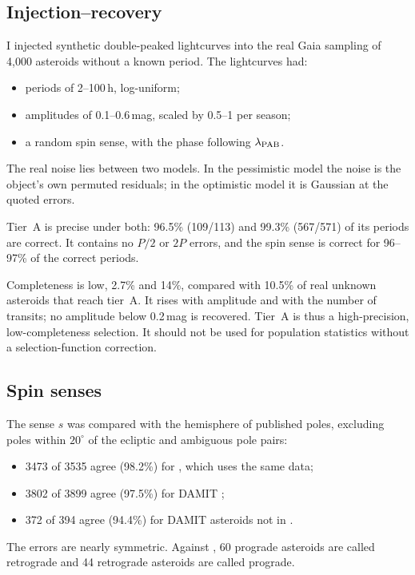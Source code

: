 \documentclass[twocolumn]{aastex631}
\begin{document}
\subsection{Injection--recovery}

I injected synthetic double-peaked lightcurves into the real Gaia sampling of 4{,}000 asteroids without a
known period. The lightcurves had:
\begin{itemize}
\item periods of 2--100\,h, log-uniform;
\item amplitudes of 0.1--0.6\,mag, scaled by 0.5--1 per season;
\item a random spin sense, with the phase following $\lambda_{\rm PAB}$.
\end{itemize}

The real noise lies between two models. In the pessimistic model the noise is the object's own permuted
residuals; in the optimistic model it is Gaussian at the quoted errors.

Tier~A is precise under both: 96.5\% (109/113) and 99.3\% (567/571) of its periods are correct. It contains
no $P/2$ or $2P$ errors, and the spin sense is correct for 96--97\% of the correct periods.

Completeness is low, 2.7\% and 14\%, compared with 10.5\% of real unknown asteroids that reach tier~A. It
rises with amplitude and with the number of transits; no amplitude below 0.2\,mag is recovered. Tier~A is
thus a high-precision, low-completeness selection. It should not be used for population statistics
without a selection-function correction.

\subsection{Spin senses}

The sense $s$ was compared with the hemisphere of published poles, excluding poles within $20^\circ$ of the
ecliptic and ambiguous pole pairs:
\begin{itemize}
\item 3473 of 3535 agree (98.2\%) for \citet{Durech2023}, which uses the same data;
\item 3802 of 3899 agree (97.5\%) for DAMIT \citep{Durech2010};
\item 372 of 394 agree (94.4\%) for DAMIT asteroids not in \citet{Durech2023}.
\end{itemize}

The errors are nearly symmetric. Against \citet{Durech2023}, 60 prograde asteroids are called retrograde
and 44 retrograde asteroids are called prograde.
\end{document}
